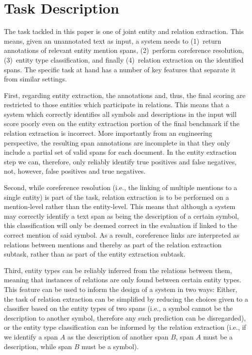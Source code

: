 \documentclass[11pt]{article}
\begin{document}
\section{Task Description}




The task tackled in this paper is one of joint entity and relation extraction. This means, given an unannotated text as input, a system needs to (1)~return annotations of relevant entity mention spans, (2)~perform coreference resolution, (3)~entity type classification, and finally (4)~relation extraction on the identified spans.
The specific task at hand has a number of key features that separate it from similar 
settings. 

First, regarding entity extraction, the annotations and, thus, the final scoring are restricted to those entities which participate in relations. 
This means that a system which correctly identifies all symbols and descriptions in the input will score poorly even on the entity extraction portion of the final benchmark if the relation extraction is incorrect.
More importantly from an engineering perspective, the resulting span annotations are incomplete in that they only include a partial set of valid spans for each document. 
In the entity extraction step we can, therefore, only reliably identify true positives and false negatives, not, however, false positives and true negatives.

Second, while coreference resolution (i.e., the linking of multiple mentions to a single entity) is part of the task, relation extraction is to be performed on a mention-level rather than the entity-level.
This means that although a system may correctly identify a text span as being the description of a certain symbol, this classification will only be deemed correct in the evaluation if linked to the correct mention of said symbol. 
As a result, coreference links are interpreted as relations between mentions and thereby as part of the relation extraction subtask, rather than as part of the entity extraction subtask.

Third, entity types can be reliably inferred from the relations between them, meaning that instances of relations are only found between certain entity types. 
This feature can be used to inform the design of a system in two ways: Either, the task of relation extraction can be simplified by reducing the choices given to a classifier based on the entity types of two spans (i.e., a symbol cannot be the description to another symbol, therefore any such prediction can be disregarded), or the entity type classification can be informed by the relation extraction (i.e., if we identify a span $A$ as the description of another span $B$, span $A$ must be a description, while span $B$ must be a symbol).
\end{document}
